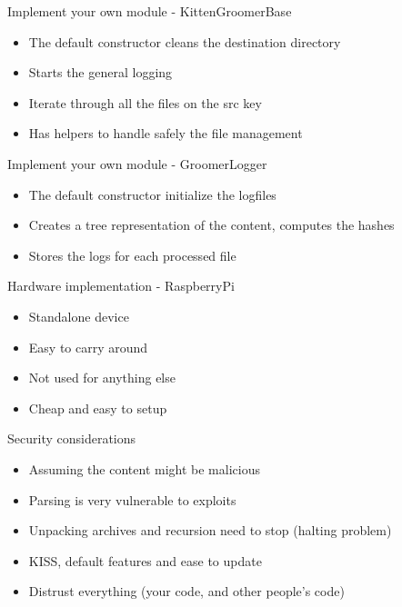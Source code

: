\begin{frame}[fragile]{Implement your own module - KittenGroomerBase}
    \begin{itemize}
        \item The default constructor cleans the destination directory
        \item Starts the general logging
        \item Iterate through all the files on the src key
        \item Has helpers to handle safely the file management
   \end{itemize}
\end{frame}

\begin{frame}[fragile]{Implement your own module - GroomerLogger}
    \begin{itemize}
        \item The default constructor initialize the logfiles
        \item Creates a tree representation of the content, computes the hashes
        \item Stores the logs for each processed file
   \end{itemize}
\end{frame}

\begin{frame}[fragile]{Hardware implementation - RaspberryPi}
    \begin{itemize}
        \item Standalone device
        \item Easy to carry around
        \item Not used for anything else
        \item Cheap and easy to setup
   \end{itemize}
\end{frame}

\begin{frame}[fragile]{Security considerations}
    \begin{itemize}
        \item Assuming the content might be malicious
        \item Parsing is very vulnerable to exploits
        \item Unpacking archives and recursion need to stop (halting problem)
        \item KISS, default features and ease to update
        \item Distrust everything (your code, and other people's code)
   \end{itemize}
\end{frame}

